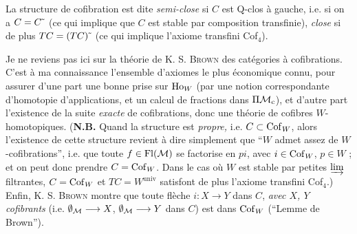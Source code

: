La structure de cofibration est dite \textit{semi-close} si $C$ est Q-clos à gauche, i.e. si on a $C=C\tilde{\ }$ (ce qui implique que $C$ est stable par composition transfinie), \textit{close} si de plus $TC=(TC)\tilde{\ }$ (ce qui implique l'axiome transfini Cof$_4$).

Je ne reviens pas ici sur la théorie de K. S. \textsc{Brown} des catégories à cofibrations. C'est à ma connaissance l'ensemble d'axiomes le plus économique connu, pour assurer d'une part une bonne prise sur $\mathrm{Ho}_W$ (par une notion correspondante d'homotopie d'applications, et un calcul de fractions dans $\Pi\mathcal{M}_{\mathrm{c}}$), et d'autre part l'existence de la suite \textit{exacte} de cofibrations, donc une théorie de cofibres $W$-homotopiques. (\textbf{N.B.} Quand la structure est \textit{propre,} i.e. $C\subset\mathrm{Cof}_W$, alors l'existence de cette structure revient à dire simplement que ``$W$ admet assez de $W$-cofibrations'', i.e. que toute $f\in\mathrm{Fl}(\mathcal{M})$ se factorise en $pi$, avec $i\in\mathrm{Cof}_W$, $p\in W$ ; et on peut donc prendre $C=\mathrm{Cof}_W$. Dans le cas où $W$ est stable par petites $\varinjlim$ filtrantes, $C=\mathrm{Cof}_W$ et $TC=W^{\mathrm{univ}}$ satisfont de plus l'axiome transfini Cof$_4$.) Enfin, K. S. \textsc{Brown} montre que toute flèche $i : X\longrightarrow Y$ dans $C$, \textit{avec $X$, $Y$ cofibrants} (i.e. $\emptyset_{\mathcal{M}}\longrightarrow X$, $\emptyset_{\mathcal{M}}\longrightarrow Y$ dans $C$) est dans $\mathrm{Cof}_W$ (``Lemme de Brown'').

